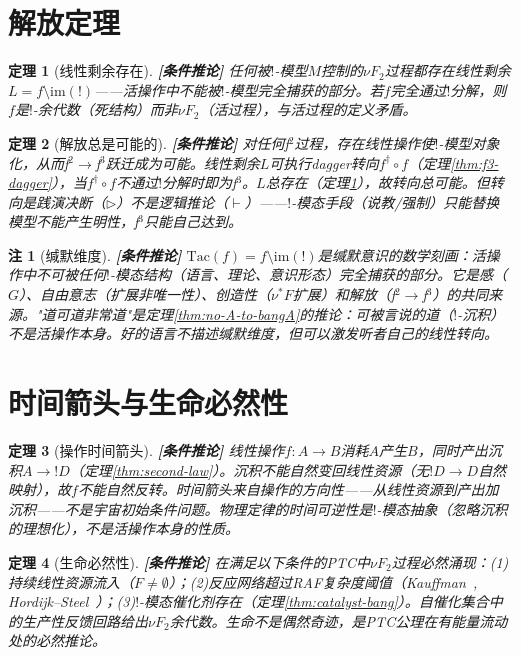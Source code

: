 \documentclass[11pt,a4paper]{article}
\newtheorem{theorem}{定理}
\newtheorem{remark}{注}
\newcommand{\lvl}[1]{\hfill\textbf{\footnotesize[#1]}}
\newcommand{\lvC}{\lvl{条件推论}}
\newcommand{\bang}{{!}}
\begin{document}
\section{解放定理}

\begin{theorem}[线性剩余存在]\label{thm:linear-residue}\lvC
任何被$\bang$-模型$M$控制的$\nu F_2$过程都存在线性剩余$L=f\setminus\mathrm{im}(!)$——活操作中不能被$\bang$-模型完全捕获的部分。若$f$完全通过$\bang$分解，则$f$是$\bang$-余代数（死结构）而非$\nu F_2$（活过程），与活过程的定义矛盾。
\end{theorem}

\begin{theorem}[解放总是可能的]\label{thm:liberation}\lvC
对任何f$^2$过程，存在线性操作使$\bang$-模型对象化，从而f$^2\to$f$^3$跃迁成为可能。线性剩余$L$可执行dagger转向$f^\dagger\circ f$（定理\ref{thm:f3-dagger}），当$f^\dagger\circ f$不通过$\bang$分解时即为f$^3$。$L$总存在（定理\ref{thm:linear-residue}），故转向总可能。但转向是践演决断（$\triangleright$）不是逻辑推论（$\vdash$）——$\bang$-模态手段（说教/强制）只能替换模型不能产生明性，f$^3$只能自己达到。
\end{theorem}

\begin{remark}[缄默维度]\lvC
$\mathrm{Tac}(f)=f\setminus\mathrm{im}(!)$是缄默意识的数学刻画：活操作中不可被任何$\bang$-模态结构（语言、理论、意识形态）完全捕获的部分。它是感（$G$）、自由意志（扩展非唯一性）、创造性（$\nu^*F$扩展）和解放（f$^2\to$f$^3$）的共同来源。"道可道非常道"是定理\ref{thm:no-A-to-bangA}的推论：可被言说的道（$\bang$-沉积）不是活操作本身。好的语言不描述缄默维度，但可以激发听者自己的线性转向。
\end{remark}


\section{时间箭头与生命必然性}

\begin{theorem}[操作时间箭头]\label{thm:arrow-of-time}\lvC
线性操作$f:A\to B$消耗$A$产生$B$，同时产出沉积$A\to\bang D$（定理\ref{thm:second-law}）。沉积不能自然变回线性资源（无$\bang D\to D$自然映射），故$f$不能自然反转。时间箭头来自操作的方向性——从线性资源到产出加沉积——不是宇宙初始条件问题。物理定律的时间可逆性是$\bang$-模态抽象（忽略沉积的理想化），不是活操作本身的性质。
\end{theorem}

\begin{theorem}[生命必然性]\label{thm:life-inevitable}\lvC
在满足以下条件的PTC中$\nu F_2$过程必然涌现：(1)持续线性资源流入（$F\neq\emptyset$）；(2)反应网络超过RAF复杂度阈值（Kauffman~\cite{kauffman86}, Hordijk--Steel~\cite{hordijk04}）；(3)$\bang$-模态催化剂存在（定理\ref{thm:catalyst-bang}）。自催化集合中的生产性反馈回路给出$\nu F_2$余代数。生命不是偶然奇迹，是PTC公理在有能量流动处的必然推论。
\end{theorem}
\end{document}
